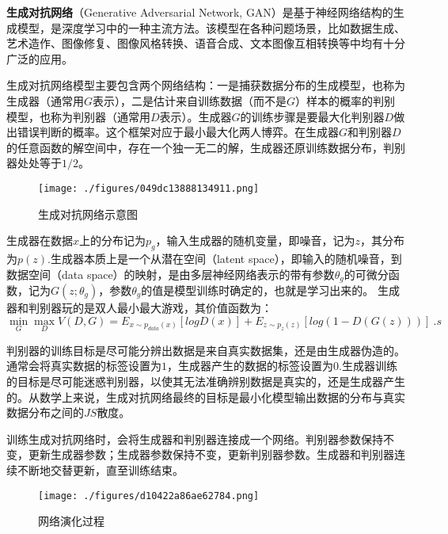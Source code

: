 
\textbf{生成对抗网络}（Generative Adversarial Network, GAN）是基于神经网络结构的生成模型，是深度学习中的一种主流方法。该模型在各种问题场景，比如数据生成、艺术造作、图像修复、图像风格转换、语音合成、文本图像互相转换等中均有十分广泛的应用。

生成对抗网络模型主要包含两个网络结构：一是捕获数据分布的生成模型，也称为生成器（通常用$G$表示），二是估计来自训练数据（而不是$G$）样本的概率的判别模型，也称为判别器（通常用$D$表示）。生成器$G$的训练步骤是要最大化判别器$D$做出错误判断的概率。这个框架对应于最小最大化两人博弈。在生成器$G$和判别器$D$的任意函数的解空间中，存在一个独一无二的解，生成器还原训练数据分布，判别器处处等于$1/2$。

\begin{figure}[ht]
\centering
\texttt{[image: ./figures/049dc13888134911.png]}
\caption{生成对抗网络示意图} \label{fig_GAN_2}
\end{figure}

生成器在数据$x$上的分布记为$p_g$，输入生成器的随机变量，即噪音，记为$z$，其分布为$p(z)$.生成器本质上是一个从潜在空间（latent space），即输入的随机噪音，到数据空间（data space）的映射，是由多层神经网络表示的带有参数$\theta_g$的可微分函数，记为$G(z;\theta_g)$，参数$\theta_g$的值是模型训练时确定的，也就是学习出来的。
生成器和判别器玩的是双人最小最大游戏，其价值函数为：
\begin{equation}
\mathop{\min}\limits_G \mathop {\max }\limits_D V(D,G)=E_{x\sim p_{data}(x)}[logD(x)]+E_{z\sim p_z(z)}[log(1-D(G(z)))]~.s
\end{equation}


判别器的训练目标是尽可能分辨出数据是来自真实数据集，还是由生成器伪造的。通常会将真实数据的标签设置为$1$，生成器产生的数据的标签设置为$0$.生成器训练的目标是尽可能迷惑判别器，以使其无法准确辨别数据是真实的，还是生成器产生的。从数学上来说，生成对抗网络最终的目标是最小化模型输出数据的分布与真实数据分布之间的$JS$散度。

训练生成对抗网络时，会将生成器和判别器连接成一个网络。判别器参数保持不变，更新生成器参数；生成器参数保持不变，更新判别器参数。生成器和判别器连续不断地交替更新，直至训练结束。
\begin{figure}[ht]
\centering
\texttt{[image: ./figures/d10422a86ae62784.png]}
\caption{网络演化过程} \label{fig_GAN_1}
\end{figure}

